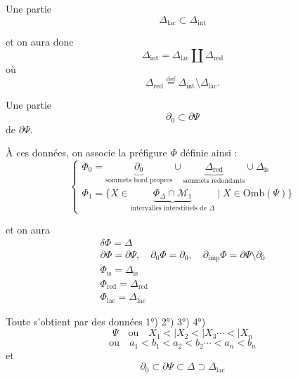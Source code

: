 \documentclass[11pt,a4paper]{article}
\begin{document}
  Une partie
\[
  \Delta_{\mathrm{lac}} \subset \Delta_{\mathrm{int}}
\]
\marginal{\struck{\ill{}}}

et on  aura donc
\[
  \Delta_{\mathrm{int}} = \Delta_{\mathrm{lac}} \amalg \Delta_{\mathrm{red}}
\]
où
\[
  \Delta_{\mathrm{red}} \overset{\mathrm{def}}{=} \Delta_{\mathrm{int}} \setminus \Delta_{\mathrm{lac}} .
\]

  Une partie
\[
  \partial_0 \subset \partial\Psi
\]
de $\partial\Psi$.

À ces données, on associe la préfigure $\Phi$ définie ainsi :
\[
  \begin{cases}
    \Phi_0 = \underbrace{\partial_0}_{\text{sommets bord propres}} \cup \underbrace{\Delta_{\mathrm{red}}}_{\text{sommets redondants}} \cup \Delta_{\mathrm{is}} \\[1ex]
    \Phi_1 = \{ X \in \underbrace{\Phi_\Delta \cap \mathcal{M}_1}_{\text{intervalles interstitiels de } \Delta} \mid X \in \mathrm{Omb}(\Psi) \}
  \end{cases}
\]



et on aura
\[
  \begin{gathered}
    \delta\Phi = \Delta \\
    \partial\Phi = \partial\Psi , \quad \partial_0\Phi = \partial_0 , \quad \partial_{\mathrm{imp}}\Phi = \partial\Psi \setminus \partial_0 \\
    \Phi_{\mathrm{is}} = \Delta_{\mathrm{is}} \\
    \Phi_{\mathrm{red}} = \Delta_{\mathrm{red}} \\
    \Phi_{\mathrm{lac}} = \Delta_{\mathrm{lac}}
  \end{gathered}
\]

Toute  s'obtient  par des données 1°) 2°) 3°) 4°)   \struck{$\partial_0 \subset \partial\Psi \subset \Delta$}
\[
  \Psi \quad \text{ou} \quad X_1 \mathrel{<\!|} X_2 \mathrel{<\!|} X_3 \cdots \mathrel{<\!|} X_n
\]
\[
  \text{ou} \quad a_1 < b_1 < a_2 < b_2 \cdots < a_n < b_n
\]
et
\[
  \boxed{\partial_0} \subset \partial\Psi \subset \boxed{\Delta} \supset \Delta_{\mathrm{lac}}
\]
\end{document}
